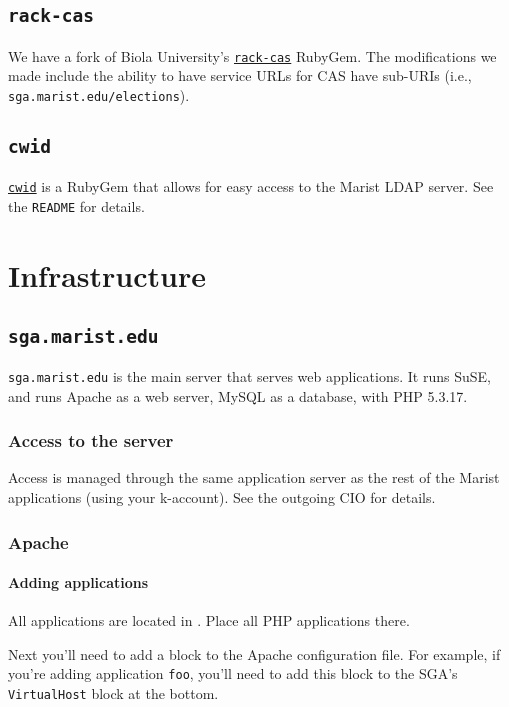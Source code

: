 \documentclass[11pt]{report}
\begin{document}
	\section{\texttt{rack-cas}}
		We have a fork of Biola University's \href{https://github.com/marist-sga/rack-cas}{\texttt{rack-cas}} RubyGem. The modifications we made include the ability to have service URLs for CAS have sub-URIs (i.e., \texttt{sga.marist.edu/elections}).

	\section{\texttt{cwid}}
		\href{https://github.com/marist-sga/cwid}{\texttt{cwid}} is a RubyGem that allows for easy access to the Marist LDAP server. See the \texttt{README} for details.

\chapter{Infrastructure}
	\section{\texttt{sga.marist.edu}}
		\texttt{sga.marist.edu} is the main server that serves web applications. It runs SuSE, and runs Apache as a web server, MySQL as a database, with PHP 5.3.17.

		\subsection{Access to the server}
			Access is managed through the same application server as the rest of the Marist applications (using your k-account). See the outgoing CIO for details.

		\subsection{Apache}
			\subsubsection{Adding applications}
				All applications are located in . Place all PHP applications there.

				Next you'll need to add a block to the Apache configuration file. For example, if you're adding application \texttt{foo}, you'll need to add this block to the SGA's \texttt{VirtualHost} block at the bottom.
\end{document}

